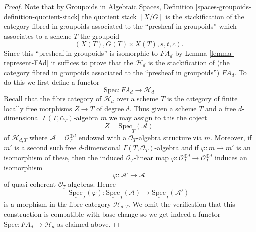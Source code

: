 \begin{proof}
Note that by
Groupoids in Algebraic Spaces,
Definition \ref{spaces-groupoids-definition-quotient-stack}
the quotient stack $[X/G]$ is the stackification of the
category fibred in groupoids associated to the ``presheaf in groupoids''
which associates to a scheme $T$ the groupoid
$$
(X(T), G(T) \times X(T), s, t, c).
$$
Since this ``presheaf in groupoids'' is isomorphic to $FA_d$ by
Lemma \ref{lemma-represent-FAd}
it suffices to prove that the $\mathcal{H}_d$ is the stackification
of (the category fibred in groupoids associated to the
``presheaf in groupoids'') $FA_d$. To do this we first define a
functor
$$
\text{Spec} : FA_d \longrightarrow \mathcal{H}_d
$$
Recall that the fibre category of $\mathcal{H}_d$ over a scheme $T$
is the category of finite locally free morphisms $Z \to T$ of degree $d$.
Thus given a scheme $T$ and a free $d$-dimensional
$\Gamma(T, \mathcal{O}_T)$-algebra $m$ we may assign to this the object
$$
Z = \underline{\text{Spec}}_T(\mathcal{A})
$$
of $\mathcal{H}_{d, T}$
where $\mathcal{A} = \mathcal{O}_T^{\oplus d}$ endowed with a
$\mathcal{O}_T$-algebra structure via $m$. Moreover, if $m'$ is
a second such free $d$-dimensional $\Gamma(T, \mathcal{O}_T)$-algebra
and if $\varphi : m \to m'$ is an isomorphism of these, then
the induced $\mathcal{O}_T$-linear map
$\varphi : \mathcal{O}_T^{\oplus d} \to \mathcal{O}_T^{\oplus d}$
induces an isomorphism
$$
\varphi : \mathcal{A}' \longrightarrow \mathcal{A}
$$
of quasi-coherent $\mathcal{O}_T$-algebras. Hence
$$
\underline{\text{Spec}}_T(\varphi) :
\underline{\text{Spec}}_T(\mathcal{A})
\longrightarrow
\underline{\text{Spec}}_T(\mathcal{A}')
$$
is a morphism in the fibre category $\mathcal{H}_{d, T}$. We omit the
verification that this construction is compatible with base change so
we get indeed a functor $\text{Spec} : FA_d \to \mathcal{H}_d$
as claimed above.


\end{proof}

